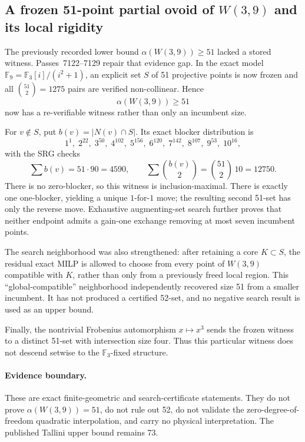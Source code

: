 \subsection{A frozen 51-point partial ovoid of $W(3,9)$ and its local rigidity}

The previously recorded lower bound $\alpha(W(3,9))\ge 51$ lacked a stored witness.
Passes~7122--7129 repair that evidence gap.  In the exact model
$\mathbb F_9=\mathbb F_3[i]/(i^2+1)$, an explicit set $S$ of 51 projective points is
now frozen and all $\binom{51}{2}=1275$ pairs are verified non-collinear.  Hence
\[
\boxed{\alpha(W(3,9))\ge 51}
\]
now has a re-verifiable witness rather than only an incumbent size.

For $v\notin S$, put $b(v)=|N(v)\cap S|$.  Its exact blocker distribution is
\[
1^1,\;2^{22},\;3^{50},\;4^{102},\;5^{156},\;6^{120},\;7^{142},\;8^{107},\;9^{53},\;10^{16},
\]
with the SRG checks
\[
\sum b(v)=51\cdot90=4590,
\qquad
\sum\binom{b(v)}2=\binom{51}{2}\,10=12750.
\]
There is no zero-blocker, so this witness is inclusion-maximal.  There is exactly
one one-blocker, yielding a unique $1$-for-$1$ move; the resulting second 51-set has
only the reverse move.  Exhaustive augmenting-set search further proves that neither
endpoint admits a gain-one exchange removing at most seven incumbent points.

The search neighborhood was also strengthened: after retaining a core $K\subset S$,
the residual exact MILP is allowed to choose from every point of $W(3,9)$ compatible
with $K$, rather than only from a previously freed local region.  This
``global-compatible'' neighborhood independently recovered size 51 from a smaller
incumbent.  It has not produced a certified 52-set, and no negative search result is
used as an upper bound.

Finally, the nontrivial Frobenius automorphism $x\mapsto x^3$ sends the frozen witness
to a distinct 51-set with intersection size four.  Thus this particular witness does
not descend setwise to the $\mathbb F_3$-fixed structure.

\paragraph{Evidence boundary.}
These are exact finite-geometric and search-certificate statements.  They do not prove
$\alpha(W(3,9))=51$, do not rule out 52, do not validate the zero-degree-of-freedom
quadratic interpolation, and carry no physical interpretation.  The published Tallini
upper bound remains 73.
